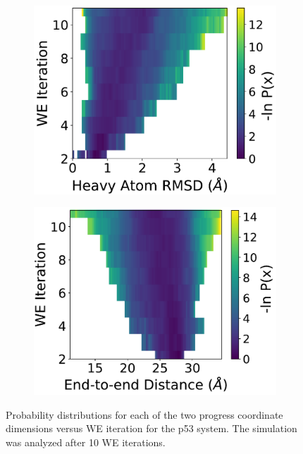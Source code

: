\begin{figure}[ht]
\centering
\begin{subfigure}[A]{0.35\textwidth}
\includegraphics[width=\linewidth]{figures/Figure6A-2.pdf}
\end{subfigure}
\begin{subfigure}[B]{0.35\textwidth}
\includegraphics[width=\linewidth]{figures/Figure6B-2.pdf}
\vspace{-0.5cm}
\end{subfigure}
\caption{Probability distributions for each of the two progress coordinate dimensions versus WE iteration for the p53 system. 
The simulation was analyzed after 10 WE iterations.}
\label{fig:p53-hist-10}
\end{figure}

